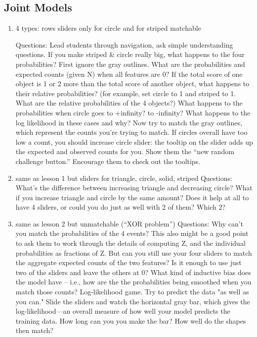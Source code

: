 \documentclass[11pt,letterpaper]{article}
\begin{document}
\subsection{Joint Models}
\begin{enumerate}
\item 
4 types: rows %
sliders only for circle and for striped
matchable

Questions: Lead students through navigation, ask simple understanding questions. If you make striped \& circle really big, what happens to the four probabilities?  First ignore the gray outlines.  What are the probabilities and expected counts (given N) when all features are 0?  If the total score of one object is 1 or 2 more than the total score of another object, what happens to their relative probabilities?  (for example, set circle to 1 and striped to 1.  What are the relative probabilities of the 4 objects?)  What happens to the probabilities when circle goes to +infinity?  to -infinity?  What happens to the log likelihood in these cases and why?  Now try to match the gray outlines, which represent the counts you’re trying to match.  If circles overall have too low a count, you should increase circle slider: the tooltip on the slider adds up the expected and observed counts for you.  Show them the “new random challenge button.”  Encourage them to check out the tooltips.
\item same as lesson 1 but sliders for triangle, circle, solid, striped
Questions: What’s the difference between increasing triangle and decreasing circle?  What if you increase triangle and circle by the same amount?  Does it help at all to have 4 sliders, or could you do just as well with 2 of them? Which 2?
\item same as lesson 2 but unmatchable (“XOR problem”)
Questions: Why can’t you match the probabilities of the 4 events? This also might be a good point to ask them to work through the details of computing Z, and the individual probabilities as fractions of Z. But can you still use your four sliders to match the aggregate expected counts of the two features?  Is it enough to use just two of the sliders and leave the others at 0?  What kind of inductive bias does the model have -- i.e., how are the the probabilities being smoothed when you match those counts?    
Log-likelihood game. Try to predict the data "as well as you can." Slide the sliders and watch the horizontal gray bar, which gives the log-likelihood—an overall measure of how well your model predicts the training data. How long can you you make the bar? How well do the shapes then match?


\end{enumerate}
\end{document}
